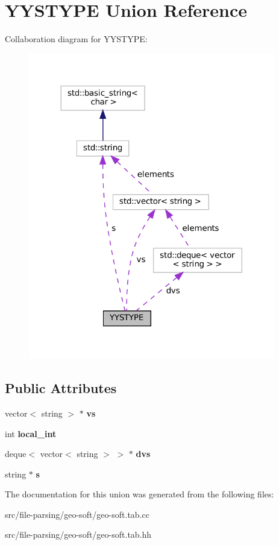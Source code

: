\hypertarget{unionYYSTYPE}{}\section{Y\+Y\+S\+T\+Y\+PE Union Reference}
\label{unionYYSTYPE}


Collaboration diagram for Y\+Y\+S\+T\+Y\+PE\+:\nopagebreak
\begin{figure}[H]
\begin{center}
\leavevmode
\includegraphics[width=305pt]{unionYYSTYPE__coll__graph}
\end{center}
\end{figure}
\subsection*{Public Attributes}
\begin{DoxyCompactItemize}
\item 
\mbox{\label{unionYYSTYPE_a0bb334c57f831d5724188ac64f03e74a}} 
vector$<$ string $>$ $\ast$ {\bfseries vs}
\item 
\mbox{\label{unionYYSTYPE_a47f61089647b6a883ac504a9a877fc21}} 
int {\bfseries local\+\_\+int}
\item 
\mbox{\label{unionYYSTYPE_a489e804ea5b945f50032f4e476b4b967}} 
deque$<$ vector$<$ string $>$ $>$ $\ast$ {\bfseries dvs}
\item 
\mbox{\label{unionYYSTYPE_aa4c63d6e4455998c51a02b9991b64d6a}} 
string $\ast$ {\bfseries s}
\end{DoxyCompactItemize}


The documentation for this union was generated from the following files\+:\begin{DoxyCompactItemize}
\item 
src/file-\/parsing/geo-\/soft/geo-\/soft.\+tab.\+cc\item 
src/file-\/parsing/geo-\/soft/geo-\/soft.\+tab.\+hh\end{DoxyCompactItemize}
